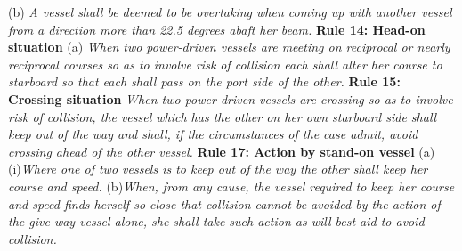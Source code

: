 (b) \textit{A vessel shall be deemed to be overtaking when coming up with another vessel from a direction more than 22.5 degrees abaft her beam.}\newline
\textbf{Rule 14: Head-on situation}\newline
(a) \textit{When two power-driven vessels are meeting on reciprocal or nearly reciprocal courses so as to involve risk of collision each shall alter her 
course to starboard so that each shall pass on the port side of the other.}\newline
\textbf{Rule 15: Crossing situation}\newline
\textit{When two power-driven vessels are crossing so as to involve risk of collision, the vessel which has the other on her own starboard 
side shall keep out of the way and shall, if the circumstances of the case admit, avoid crossing ahead of the other vessel.}\newline
\textbf{Rule 17: Action by stand-on vessel}\newline
(a)(i)\textit{Where one of two vessels is to keep out of the way the other shall keep her course and speed.}\newline
(b)\textit{When, from any cause, the vessel required to keep her course and speed finds herself so close that collision 
cannot be avoided by the action of the give-way vessel alone, she shall take such action as will best aid to avoid collision.}


